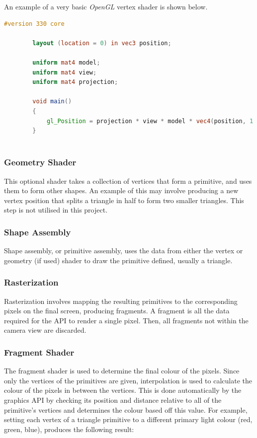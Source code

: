 \documentclass[12pt]{article}
\begin{document}
    An example of a very basic \textit{OpenGL} vertex shader is shown below.

    \begin{lstlisting}[language=glsl]
        #version 330 core

        layout (location = 0) in vec3 position;

        uniform mat4 model;
        uniform mat4 view;
        uniform mat4 projection;

        void main()
        {
            gl_Position = projection * view * model * vec4(position, 1.0);
        }
        
    \end{lstlisting}

    \subsubsection{Geometry Shader}

    This optional shader takes a collection of vertices that form a primitive, and uses them to form other shapes. An example of this may involve producing a new vertex position that splits a triangle in half to form two smaller triangles. This step is not utilised in this project.

    \subsubsection{Shape Assembly}

    Shape assembly, or primitive assembly, uses the data from either the vertex or geometry (if used) shader to draw the primitive defined, usually a triangle.

    \subsubsection{Rasterization}

    Rasterization involves mapping the resulting primitives to the corresponding pixels on the final screen, producing fragments. A fragment is all the data required for the API to render a single pixel. Then, all fragments not within the camera view are discarded.

    \subsubsection{Fragment Shader}

    The fragment shader is used to determine the final colour of the pixels. Since only the vertices of the primitives are given, interpolation is used to calculate the colour of the pixels in between the vertices. This is done automatically by the graphics API by checking its position and distance relative to all of the primitive's vertices and determines the colour based off this value. For example, setting each vertex of a triangle primitive to a different primary light colour (red, green, blue), produces the following result:
\end{document}
